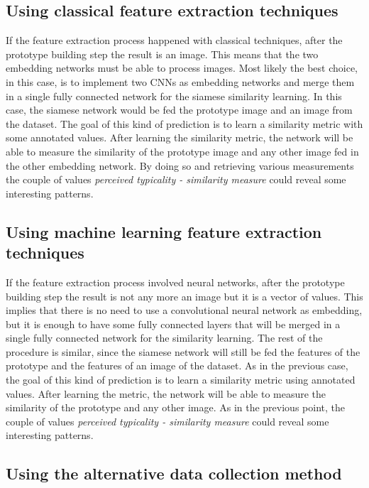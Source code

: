 \documentclass[conference]{IEEEtran}
\begin{document}
		\subsection{Using classical feature extraction techniques\label{sec:slcfet}}
		
			\noindent If the feature extraction process happened with classical techniques, after the prototype building step the result is an image. This means that the two embedding networks must be able to process 
			images. Most likely the best choice, in this case, is to implement two CNNs as embedding networks and merge them in a single fully connected network for the siamese similarity learning. 
			In this case, the siamese network would be fed the prototype image and an image from the dataset. The goal of this kind of prediction is to learn a similarity metric with some annotated values. 
			After learning the similarity metric, the network will be able to measure the similarity of the prototype image and any other image fed in the other embedding network. By doing so and retrieving various 
			measurements the couple of values \textit{perceived typicality - similarity measure} could reveal some interesting patterns.
		
		\subsection{Using machine learning feature extraction techniques\label{sec:slmlfet}}
		
			\noindent If the feature extraction process involved neural networks, after the prototype building step the result is not any more an image but it is a vector of values. This implies that there is no need to 
			use a convolutional neural network as embedding, but it is enough to have some fully connected layers that will be merged in a single fully connected network for the similarity learning. The rest of the procedure 
			is similar, since the siamese network will still be fed the features of the prototype and the features of an image of the dataset. As in the previous case, the goal of this kind of prediction is to learn 
			a similarity metric using annotated values. After learning the metric, the network will be able to measure the similarity of the prototype and any other image. 
			As in the previous point, the couple of values \textit{perceived typicality - similarity measure} could reveal some interesting patterns.
			
		\subsection{Using the alternative data collection method}
		
\end{document}
